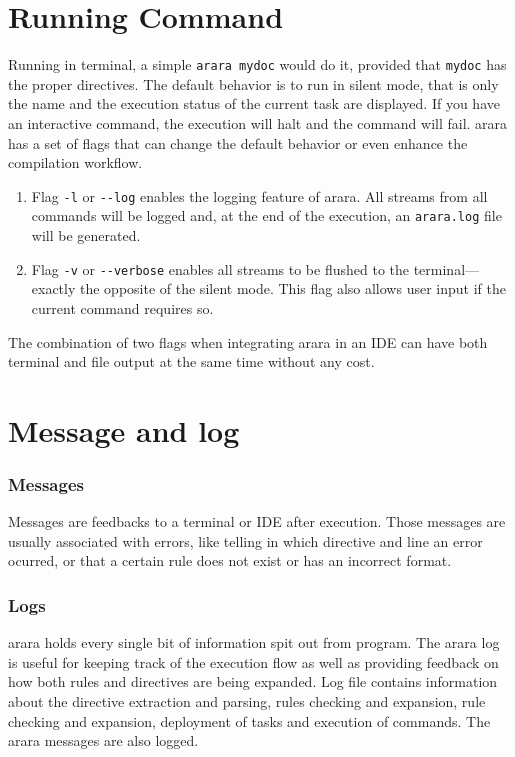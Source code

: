 \documentclass[a4paper]{article}
\begin{document}
\part{Running Command}
Running in terminal, a simple \verb|arara mydoc| would do it, provided that \verb|mydoc| has the proper directives. The default behavior is to run in silent mode, that is only the name and the execution status of the current task are displayed.
If you have an interactive command, the execution will halt and the command will fail. 
arara has a set of flags that can change the default behavior or even enhance the compilation workflow.
\begin{enumerate}
  \item Flag \verb|-l| or \verb|--log| enables the logging feature of arara. All streams from all commands will be logged and, at the end of the execution, an \verb|arara.log| file will be generated.
  \item Flag \verb|-v| or \verb|--verbose| enables all streams to be flushed to the terminal---exactly the opposite of the silent mode. This flag also allows user input if the current command requires so. 
\end{enumerate}

The combination of two flags when integrating arara in an IDE can have both terminal and file output at the same time without any cost.
\part{Message and log}
\section{Messages}
Messages are feedbacks to a terminal or IDE after execution.
Those messages are usually associated with errors, like telling in which directive and line an error ocurred, or that a certain rule does not exist or has an incorrect format.
\section{Logs}
arara holds every single bit of information spit out from program. The arara log is useful for keeping track of the execution flow as well as providing feedback on how both rules and directives are being expanded. 
Log file contains information about the directive extraction and parsing, rules checking and expansion, rule checking and expansion, deployment of tasks and execution of commands. The arara messages are also logged.
\end{document}
